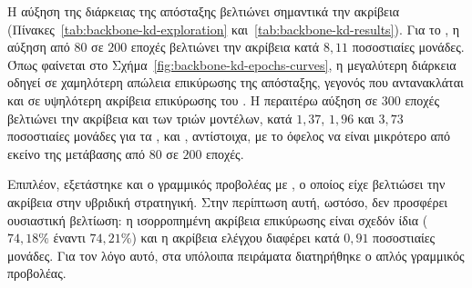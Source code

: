 Η αύξηση της διάρκειας της απόσταξης βελτιώνει σημαντικά την ακρίβεια
(Πίνακες~\ref{tab:backbone-kd-exploration} και~\ref{tab:backbone-kd-results}). Για το , η
αύξηση από \(80\) σε \(200\) εποχές βελτιώνει την ακρίβεια κατά
\(8{,}11\) ποσοστιαίες μονάδες. Όπως φαίνεται στο
Σχήμα~\ref{fig:backbone-kd-epochs-curves}, η μεγαλύτερη διάρκεια
οδηγεί σε χαμηλότερη απώλεια επικύρωσης της απόσταξης, γεγονός που
αντανακλάται και σε υψηλότερη ακρίβεια επικύρωσης του
. Η περαιτέρω αύξηση σε \(300\) εποχές
βελτιώνει την ακρίβεια και των τριών μοντέλων, κατά \(1{,}37\),
\(1{,}96\) και \(3{,}73\) ποσοστιαίες μονάδες για τα ,
 και , αντίστοιχα, με το όφελος να είναι μικρότερο
από εκείνο της μετάβασης από \(80\) σε \(200\) εποχές.

Επιπλέον, εξετάστηκε και ο γραμμικός προβολέας με , ο οποίος
είχε βελτιώσει την ακρίβεια στην υβριδική στρατηγική. Στην περίπτωση
αυτή, ωστόσο, δεν προσφέρει ουσιαστική βελτίωση: η ισορροπημένη
ακρίβεια επικύρωσης είναι σχεδόν ίδια (\(74{,}18\%\) έναντι
\(74{,}21\%\)) και η ακρίβεια ελέγχου διαφέρει κατά \(0{,}91\)
ποσοστιαίες μονάδες. Για τον λόγο αυτό, στα υπόλοιπα πειράματα
διατηρήθηκε ο απλός γραμμικός προβολέας.

